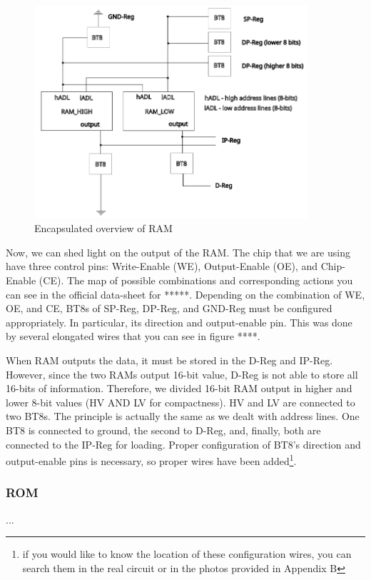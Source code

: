 \begin{figure}[H]
	\centering
	\includegraphics[width=0.9\textwidth]{img/ram}
	\caption{Encapsulated overview of RAM}
	\label{fig:ram}
\end{figure}

Now, we can shed light on the output of the RAM. The chip that we are using have three control pins: Write-Enable (WE), Output-Enable (OE), and Chip-Enable (CE). The map of possible combinations and corresponding actions you can see in the official data-sheet for *****. Depending on the combination of WE, OE, and CE, BT8s of SP-Reg, DP-Reg, and GND-Reg must be configured appropriately. In particular, its direction and output-enable pin. This was done by several elongated wires that you can see in figure ****.

When RAM outputs the data, it must be stored in the D-Reg and IP-Reg. However, since the two RAMs output 16-bit value, D-Reg is not able to store all 16-bits of information. Therefore, we divided 16-bit RAM output in higher and lower 8-bit values (HV AND LV for compactness). HV and LV are connected to two BT8s. The principle is actually the same as we dealt with address lines. One BT8 is connected to ground, the second to D-Reg, and, finally, both are connected to the IP-Reg for loading. Proper configuration of BT8's direction and output-enable pins is necessary, so proper wires have been added\footnote{if you would like to know the location of these configuration wires, you can search them in the real circuit or in the photos provided in Appendix B}.

\subsubsection{ROM} \label{sec:implementation:memory:rom}
...


